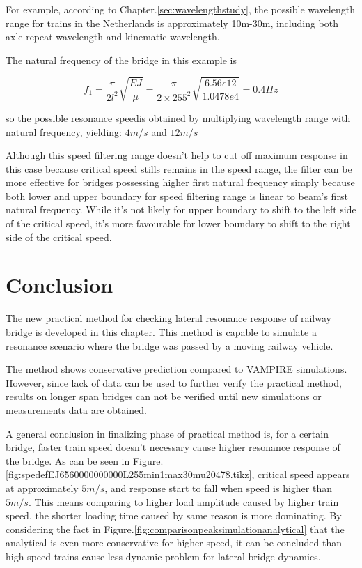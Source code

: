 For example, according to Chapter.\ref{sec:wavelengthstudy}, the possible wavelength range for trains in the Netherlands is approximately 10m-30m, including both axle repeat wavelength and kinematic wavelength. 

The natural frequency of the bridge in this example is 

$$ f_1 = \frac{\pi}{2l^2}\sqrt{\frac{EJ}{\mu}} = \frac{\pi}{2\times 255^2}\sqrt{\frac{6.56e12}{1.0478e4}} = 0.4Hz$$

so the possible resonance speedis obtained by multiplying wavelength range with natural frequency, yielding: $4m/s$ and $12m/s$

Although this speed filtering range doesn't help to cut off maximum response in this case because critical speed stills remains in the speed range, the filter can be more effective for bridges possessing higher first natural frequency simply because both lower and upper boundary for speed filtering range is linear to beam's first natural frequency. While it's not likely for upper boundary to shift to the left side of the critical speed, it's more favourable for lower boundary to shift to the right side of the critical speed.

\section{Conclusion}

The new practical method for checking lateral resonance response of railway bridge is developed in this chapter. This method is capable to simulate a resonance scenario where the bridge was passed by a moving railway vehicle. 

The method shows conservative prediction compared to VAMPIRE simulations. However, since lack of data can be used to further verify the practical method, results on longer span bridges can not be verified until new simulations or measurements data are obtained.

A general conclusion in finalizing phase of practical method is, for a certain bridge, faster train speed doesn't necessary cause higher resonance response of the bridge. As can be seen in Figure.\ref{fig:spedefEJ6560000000000L255min1max30mu20478.tikz}, critical speed appears at approximately $5m/s$, and response start to fall when speed is higher than $5m/s$. This means comparing to higher load amplitude caused by higher train speed, the shorter loading time caused by same reason is more dominating. By considering the fact in Figure.\ref{fig:comparisonpeaksimulationanalytical} that the analytical is even more conservative for higher speed, it can be concluded than high-speed trains cause less dynamic problem for lateral bridge dynamics.


